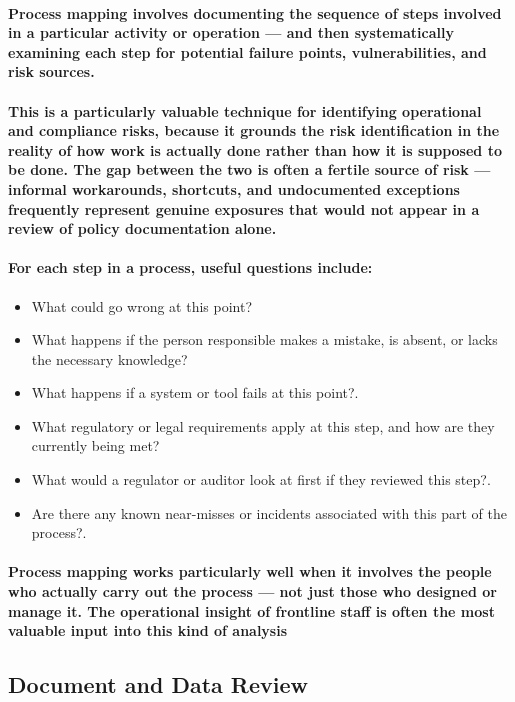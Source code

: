 \paragraph{\textbf{Process mapping} involves documenting the sequence of steps involved in a particular activity or operation — and then systematically examining each step for potential failure points, vulnerabilities, and risk sources.}
\paragraph{This is a particularly valuable technique for identifying operational and compliance risks, because it grounds the risk identification in the reality of how work is actually done rather than how it is supposed to be done. The gap between the two is often a fertile source of risk — informal workarounds, shortcuts, and undocumented exceptions frequently represent genuine exposures that would not appear in a review of policy documentation alone.}
\paragraph{For each step in a process, useful questions include:}
\begin{itemize}
    \item{What could go wrong at this point?}
    \item{What happens if the person responsible makes a mistake, is absent, or lacks the necessary knowledge?}
    \item{What happens if a system or tool fails at this point?.}
    \item{What regulatory or legal requirements apply at this step, and how are they currently being met?}
    \item{What would a regulator or auditor look at first if they reviewed this step?.}
    \item{Are there any known near-misses or incidents associated with this part of the process?.}
\end{itemize}
\paragraph{Process mapping works particularly well when it involves the people who actually carry out the process — not just those who designed or manage it. The operational insight of frontline staff is often the most valuable input into this kind of analysis}

\subsection{Document and Data Review}
